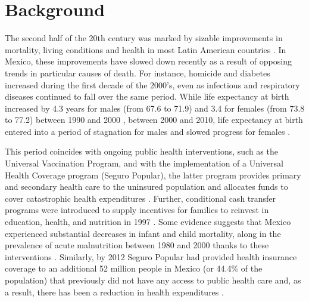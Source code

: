 \documentclass{bmcart}
\begin{document}



\section*{Background}
The second half of the 20th century was marked by sizable improvements in mortality, living
conditions and health in most Latin American countries \cite{who2000}. 
In Mexico, these improvements have slowed down recently as a result of opposing
trends in particular causes of death. For instance, homicide and diabetes
increased during the first decade of the 2000's, even as infectious and
respiratory diseases continued to fall over the same period. While life
expectancy at birth increased by 4.3 years for males (from 67.6 to 71.9) and 3.4
for females (from 73.8 to 77.2) between 1990 and 2000 \cite{SOMEDE},
between 2000 and 2010, life expectancy at birth entered into a period of
stagnation for males and slowed progress for females \cite{canudas2014}. 


This
period coincides with ongoing public health interventions, such as the Universal Vaccination Program, and with the implementation of a Universal Health Coverage program (Seguro
Popular), the latter program provides primary and secondary
health care to the uninsured population and allocates funds to cover catastrophic
health expenditures \cite{knaul2005}. Further, conditional cash transfer programs were introduced to supply incentives for families to reinvest in education, health, and nutrition in 1997 \cite{neufeld2012}. Some evidence
suggests that Mexico experienced substantial decreases in infant and child
mortality, along in the prevalence of acute malnutrition between 1980 and 2000
thanks to these interventions \cite{sepulveda2006}. Similarly, by 2012 Seguro Popular had provided health insurance coverage to an additional 52 million
people in Mexico (or 44.4\% of the population) that previously did not have any access to public health care and, as a result, there has been a reduction in health expenditures \cite{knaul2012}.
\end{document}
